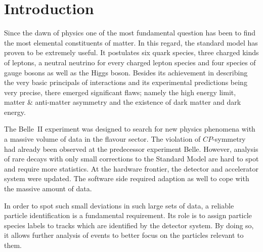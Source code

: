 \chapter{Introduction}
\label{chap:introduction}

Since the dawn of physics one of the most fundamental question has been to find the most elemental constituents of matter. In this regard, the standard model has proven to be extremely useful. It postulates six quark species, three charged kinds of leptons, a neutral neutrino for every charged lepton species and four species of gauge bosons as well as the Higgs boson. Besides its achievement in describing the very basic principals of interactions and its experimental predictions being very precise, there emerged significant flaws; namely the high energy limit, matter \& anti-matter asymmetry and the existence of dark matter and dark energy.

The Belle~\RN{2} experiment was designed to search for new physics phenomena with a massive volume of data in the flavour sector. The violation of $CP$-symmetry had already been observed at the predecessor experiment Belle. However, analysis of rare decays with only small corrections to the Standard Model are hard to spot and require more statistics. At the hardware frontier, the detector and accelerator system were updated. The software side required adaption as well to cope with the massive amount of data.

In order to spot such small deviations in such large sets of data, a reliable particle identification is a fundamental requirement. Its role is to assign particle species labels to tracks which are identified by the detector system. By doing so, it allows further analysis of events to better focus on the particles relevant to them.
